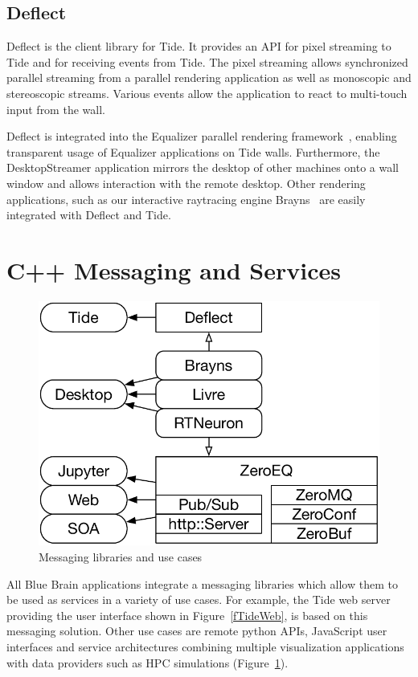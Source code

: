 \documentclass[10pt]{llncs}
\newcommand{\fig}[1]{Figure~\ref{#1}}
\begin{document}
\subsection{Deflect}

Deflect is the client library for Tide. It provides an API for pixel streaming
to Tide and for receiving events from Tide. The pixel streaming allows
synchronized parallel streaming from a parallel rendering application as well as
monoscopic and stereoscopic streams. Various events allow the application to
react to multi-touch input from the wall.

Deflect is integrated into the Equalizer parallel rendering
framework~\cite{EMP:09}, enabling transparent usage of Equalizer applications on
Tide walls. Furthermore, the DesktopStreamer application mirrors the desktop of
other machines onto a wall window and allows interaction with the remote
desktop. Other rendering applications, such as our interactive raytracing
engine Brayns~\cite{brayns} are easily integrated with Deflect and Tide.

\section{C++ Messaging and Services}

\begin{figure}\center\vspace{-6ex}
  \includegraphics[width=.382\textwidth]{images/ZeroMS}
  {\caption{\label{fZero}Messaging libraries and use cases}}\vspace{-2ex}
\end{figure}

All Blue Brain applications integrate a messaging libraries which allow them
to be used as services in a variety of use cases. For example, the Tide web
server providing the user interface shown in \fig{fTideWeb}, is based on this
messaging solution. Other use cases are remote python APIs, JavaScript user
interfaces and service architectures combining multiple visualization
applications with data providers such as HPC simulations (\fig{fZero}).
\end{document}
